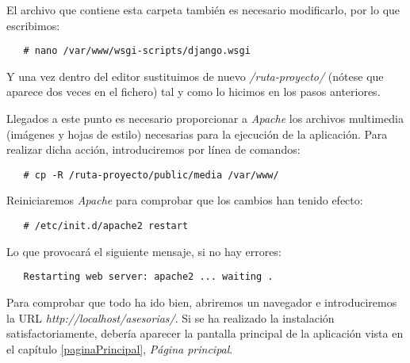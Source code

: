    El archivo que contiene esta carpeta también es necesario modificarlo, por
   lo que escribimos:

   \begin{verbatim}
   # nano /var/www/wsgi-scripts/django.wsgi
   \end{verbatim}

   Y una vez dentro del editor sustituimos de nuevo \textit{/ruta-proyecto/}
   (nótese que aparece dos veces en el fichero) tal y como lo hicimos en los
   pasos anteriores.

   Llegados a este punto es necesario proporcionar a \textit{Apache} los
   archivos multimedia (imágenes y hojas de estilo) necesarias para la ejecución
   de la aplicación. Para realizar dicha acción, introduciremos por línea de
   comandos:

   \begin{verbatim}
   # cp -R /ruta-proyecto/public/media /var/www/
   \end{verbatim}

   Reiniciaremos \textit{Apache} para comprobar que los cambios han tenido
   efecto:

   \begin{verbatim}
   # /etc/init.d/apache2 restart
   \end{verbatim}

   Lo que provocará el siguiente mensaje, si no hay errores:

   \begin{verbatim}
   Restarting web server: apache2 ... waiting .
   \end{verbatim}

   Para comprobar que todo ha ido bien, abriremos un navegador e introduciremos
   la URL \textit{http://localhost/asesorias/}. Si se ha realizado la
   instalación satisfactoriamente, debería aparecer la pantalla principal
   de la aplicación vista en el capítulo \ref{paginaPrincipal},
   \textit{Página principal}.